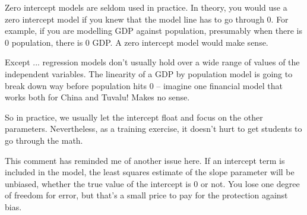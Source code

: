 \documentclass[a4paper,12pt]{article}
\begin{document}
Zero intercept models are seldom used in practice. In theory, you would use a zero intercept model if you knew that the model line has to go through 0. For example, if you are modelling GDP against population, presumably when there is 0 population, there is 0 GDP. A zero intercept model would make sense.

Except ... regression models don't usually hold over a wide range of values of the independent variables. The linearity of a GDP by population model is going to break down way before population hits 0 -- imagine one financial model that works both for China and Tuvalu! Makes no sense.

So in practice, we usually let the intercept float and focus on the other parameters. Nevertheless, as a training exercise, it doesn't hurt to get students to go through the math.

This comment has reminded me of another issue here. If an intercept term is included in the model, the least squares estimate of the slope parameter will be unbiased, whether the true value of the intercept is 0 or not. You lose one degree of freedom for error, but that's a small price to pay for the protection against bias.
\end{document}
